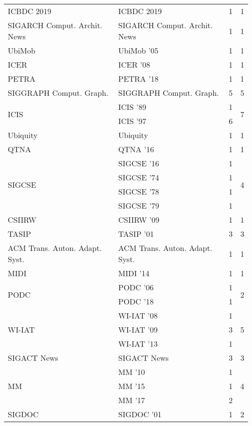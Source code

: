 \begin{table*}[t]
\begin{tabular}{llrr}
\multirow{1}{*}{ICBDC 2019} & ICBDC 2019 & 1 & \multirow{1}{*}{1}\\
\multirow{1}{*}{SIGARCH Comput. Archit. News} & SIGARCH Comput. Archit. News & 1 & \multirow{1}{*}{1}\\
\multirow{1}{*}{UbiMob } & UbiMob '05 & 1 & \multirow{1}{*}{1}\\
\multirow{1}{*}{ICER } & ICER '08 & 1 & \multirow{1}{*}{1}\\
\multirow{1}{*}{PETRA } & PETRA '18 & 1 & \multirow{1}{*}{1}\\
\multirow{1}{*}{SIGGRAPH Comput. Graph.} & SIGGRAPH Comput. Graph. & 5 & \multirow{1}{*}{5}\\
\multirow{2}{*}{ICIS } & ICIS '89 & 1 & \multirow{2}{*}{7}\\
& ICIS '97 & 6 &\\
\multirow{1}{*}{Ubiquity} & Ubiquity & 1 & \multirow{1}{*}{1}\\
\multirow{1}{*}{QTNA } & QTNA '16 & 1 & \multirow{1}{*}{1}\\
\multirow{4}{*}{SIGCSE } & SIGCSE '16 & 1 & \multirow{4}{*}{4}\\
& SIGCSE '74 & 1 &\\
& SIGCSE '78 & 1 &\\
& SIGCSE '79 & 1 &\\
\multirow{1}{*}{CSIIRW } & CSIIRW '09 & 1 & \multirow{1}{*}{1}\\
\multirow{1}{*}{TASIP } & TASIP '01 & 3 & \multirow{1}{*}{3}\\
\multirow{1}{*}{ACM Trans. Auton. Adapt. Syst.} & ACM Trans. Auton. Adapt. Syst. & 1 & \multirow{1}{*}{1}\\
\multirow{1}{*}{MIDI } & MIDI '14 & 1 & \multirow{1}{*}{1}\\
\multirow{2}{*}{PODC } & PODC '06 & 1 & \multirow{2}{*}{2}\\
& PODC '18 & 1 &\\
\multirow{3}{*}{WI-IAT } & WI-IAT '08 & 1 & \multirow{3}{*}{5}\\
& WI-IAT '09 & 3 &\\
& WI-IAT '13 & 1 &\\
\multirow{1}{*}{SIGACT News} & SIGACT News & 3 & \multirow{1}{*}{3}\\
\multirow{3}{*}{MM } & MM '10 & 1 & \multirow{3}{*}{4}\\
& MM '15 & 1 &\\
& MM '17 & 2 &\\
\multirow{2}{*}{SIGDOC } & SIGDOC '01 & 1 & \multirow{2}{*}{2}\\

\end{tabular}
\end{table*}
